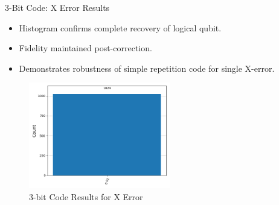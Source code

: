 \documentclass[10pt]{beamer}
\begin{document}
\begin{frame}{3-Bit Code: X Error Results}
\begin{itemize}
    \item Histogram confirms complete recovery of logical qubit.
    \item Fidelity maintained post-correction.
    \item Demonstrates robustness of simple repetition code for single X-error.
\end{itemize}

\vspace{0.3cm}
\begin{figure}
    \centering
    \includegraphics[width=0.55\textwidth]{../../Codes/results/3bitCode/3bitCodeHistogram.png}
    \caption{3-bit Code Results for X Error}
    \label{fig:3bitCodeHistogram}
\end{figure}
\end{frame}

\end{document}
